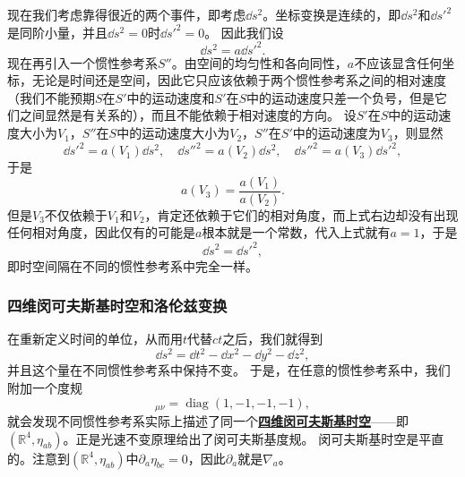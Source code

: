 \documentclass[hyperref, UTF8, a4paper]{ctexart}
\DeclareMathOperator{\diag}{diag}
\newcommand*{\concept}[1]{\underline{\textbf{#1}}}
\begin{document}
现在我们考虑靠得很近的两个事件，即考虑$\dd{s^2}$。坐标变换是连续的，即$\dd{s^2}$和$\dd{s'^2}$是同阶小量，并且$\dd{s^2}=0$时$\dd{s'^2}=0$。
因此我们设
\[
    \dd{s^2} = a \dd{s'^2}.
\]
现在再引入一个惯性参考系$S''$。由空间的均匀性和各向同性，$a$不应该显含任何坐标，无论是时间还是空间，因此它只应该依赖于两个惯性参考系之间的相对速度（我们不能预期$S$在$S'$中的运动速度和$S'$在$S$中的运动速度只差一个负号，但是它们之间显然是有关系的），而且不能依赖于相对速度的方向。
设$S'$在$S$中的运动速度大小为$V_1$，$S''$在$S$中的运动速度大小为$V_2$，$S''$在$S'$中的运动速度为$V_3$，则显然
\[
    \dd{s'^2} = a(V_1) \dd{s^2}, \quad \dd{s''^2} = a(V_2) \dd{s^2}, \quad \dd{s''^2} = a(V_3) \dd{s'^2},
\]
于是
\[
    a(V_3) = \frac{a(V_1)}{a(V_2)}.
\]
但是$V_3$不仅依赖于$V_1$和$V_2$，肯定还依赖于它们的相对角度，而上式右边却没有出现任何相对角度，因此仅有的可能是$a$根本就是一个常数，代入上式就有$a = 1$，于是
\begin{equation}
    \dd{s^2} = \dd{s'^2},
\end{equation}
即时空间隔在不同的惯性参考系中完全一样。

\subsubsection{四维闵可夫斯基时空和洛伦兹变换}

在重新定义时间的单位，从而用$t$代替$ct$之后，我们就得到
\begin{equation}
    \dd{s}^2 = \dd{t}^2 - \dd{x}^2 - \dd{y}^2 - \dd{z}^2,
\end{equation}
并且这个量在不同惯性参考系中保持不变。
于是，在任意的惯性参考系中，我们附加一个度规
\begin{equation}
    [\eta_{\mu \nu}]_{\mu \nu} = \diag{(1, -1, -1, -1)},
    \label{eq:min-metrics}
\end{equation}
就会发现不同惯性参考系实际上描述了同一个\concept{四维闵可夫斯基时空}——即$(\mathbb{R}^4, \eta_{ab})$。正是光速不变原理给出了闵可夫斯基度规。
闵可夫斯基时空是平直的。注意到$(\mathbb{R}^4, \eta_{ab})$中$\partial_a \eta_{bc} = 0$，因此$\partial_a$就是$\nabla_a$。
\end{document}
